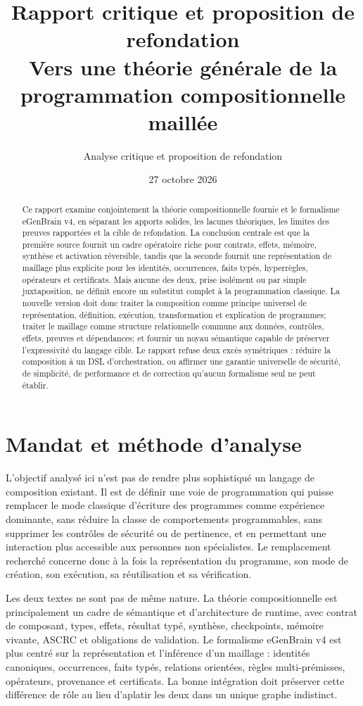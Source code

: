 \documentclass[11pt,a4paper]{article}
\title{Rapport critique et proposition de refondation\\\large Vers une théorie générale de la programmation compositionnelle maillée}
\author{Analyse critique et proposition de refondation}
\date{27 octobre 2026}
\begin{document}
\maketitle
\begin{abstract}
Ce rapport examine conjointement la théorie compositionnelle fournie et le formalisme eGenBrain v4, en séparant les apports solides, les lacunes théoriques, les limites des preuves rapportées et la cible de refondation. La conclusion centrale est que la première source fournit un cadre opératoire riche pour contrats, effets, mémoire, synthèse et activation réversible, tandis que la seconde fournit une représentation de maillage plus explicite pour les identités, occurrences, faits typés, hyperrègles, opérateurs et certificats. Mais aucune des deux, prise isolément ou par simple juxtaposition, ne définit encore un substitut complet à la programmation classique. La nouvelle version doit donc traiter la composition comme principe universel de représentation, définition, exécution, transformation et explication de programmes; traiter le maillage comme structure relationnelle commune aux données, contrôles, effets, preuves et dépendances; et fournir un noyau sémantique capable de préserver l'expressivité du langage cible. Le rapport refuse deux excès symétriques : réduire la composition à un DSL d'orchestration, ou affirmer une garantie universelle de sécurité, de simplicité, de performance et de correction qu'aucun formalisme seul ne peut établir.
\end{abstract}
\tableofcontents
\newpage

\section{Mandat et méthode d'analyse}
L'objectif analysé ici n'est pas de rendre plus sophistiqué un langage de composition existant. Il est de définir une voie de programmation qui puisse remplacer le mode classique d'écriture des programmes comme expérience dominante, sans réduire la classe de comportements programmables, sans supprimer les contrôles de sécurité ou de pertinence, et en permettant une interaction plus accessible aux personnes non spécialistes. Le remplacement recherché concerne donc à la fois la représentation du programme, son mode de création, son exécution, sa réutilisation et sa vérification.

Les deux textes ne sont pas de même nature. La théorie compositionnelle est principalement un cadre de sémantique et d'architecture de runtime, avec contrat de composant, types, effets, résultat typé, synthèse, checkpoints, mémoire vivante, ASCRC et obligations de validation. Le formalisme eGenBrain v4 est plus centré sur la représentation et l'inférence d'un maillage : identités canoniques, occurrences, faits typés, relations orientées, règles multi-prémisses, opérateurs, provenance et certificats. La bonne intégration doit préserver cette différence de rôle au lieu d'aplatir les deux dans un unique graphe indistinct.
\end{document}
